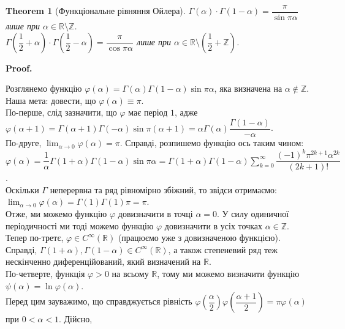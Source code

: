 \documentclass[a4paper, 10pt]{article}
\makeatletter
\def\qed{$\blacksquare$}
\theoremstyle{theoremdd}
\newtheorem{theorem}{Theorem}[subsection]
\theoremstyle{theoremdd}
\theoremstyle{theoremdd}
\theoremstyle{theoremdd}
\theoremstyle{theoremdd}
\theoremstyle{theoremdd}
\theoremstyle{theoremdd}
\theoremstyle{theoremdd}
\theoremstyle{theoremdd}
\renewenvironment{proof}[1][Proof.\\]{\par
\pushQED{\hfill \qed}%
\normalfont \topsep6\p@\@plus6\p@\relax
\trivlist
\item\relax
{\bfseries
#1\@addpunct{.}}\hspace\labelsep\ignorespaces
}{%
\popQED\endtrivlist\@endpefalse
}
\makeatother
\begin{document}
\begin{theorem}[Функціональне рівняння Ойлера]
$\Gamma(\alpha) \cdot \Gamma(1-\alpha) = \dfrac{\pi}{\sin \pi \alpha}$ лише при $\alpha \in \mathbb{R} \setminus \mathbb{Z}$.\\
$\Gamma \left(\dfrac{1}{2} + \alpha \right) \cdot \Gamma \left(\dfrac{1}{2}-\alpha \right) = \dfrac{\pi}{\cos \pi \alpha}$ лише при $\alpha \in \mathbb{R} \setminus \left( \dfrac{1}{2}  + \mathbb{Z} \right)$.
\end{theorem}

\begin{proof}
Розглянемо функцію $\varphi(\alpha) = \Gamma(\alpha) \Gamma(1-\alpha) \sin \pi \alpha$, яка визначена на $\alpha \notin \mathbb{Z}$. Наша мета: довести, що $\varphi(\alpha) \equiv \pi$.\\
По-перше, слід зазначити, що $\varphi$ має період $1$, адже\\
$\varphi(\alpha+1) = \Gamma(\alpha+1)\Gamma(-\alpha) \sin \pi(\alpha+1) = \alpha \Gamma(\alpha) \dfrac{\Gamma(1-\alpha)}{-\alpha}$.\\
По-друге, $\displaystyle\lim_{\alpha \to 0} \varphi(\alpha) = \pi$. Справді, розпишемо функцію ось таким чином:\\
$\displaystyle\varphi(\alpha) = \dfrac{1}{\alpha} \Gamma(1+\alpha) \Gamma(1-\alpha) \sin \pi \alpha = \Gamma(1+\alpha) \Gamma(1-\alpha) \sum_{k=0}^\infty \dfrac{(-1)^k\pi^{2k+1} \alpha^{2k}}{(2k+1)!}$.\\
Оскільки $\Gamma$ неперервна та ряд рівномірно збіжний, то звідси отримаємо:\\
$\displaystyle\lim_{\alpha \to 0} \varphi(\alpha) = \Gamma(1) \Gamma(1) \pi = \pi$.\\
Отже, ми можемо функцію $\varphi$ довизначити в точці $\alpha = 0$. У силу одиничної періодичності ми тоді можемо функцію $\varphi$ довизначити в усіх точках $\alpha \in \mathbb{Z}$.\\
Тепер по-третє, $\varphi \in C^{\infty}(\mathbb{R})$ (працюємо уже з довизначеною функцією). Справді, $\Gamma(1+\alpha), \Gamma(1-\alpha) \in C^{\infty}(\mathbb{R})$, а також степеневий ряд теж нескінченно диференційований, який визначений на $\mathbb{R}$.\\
По-четверте, функція $\varphi > 0$ на всьому $\mathbb{R}$, тому ми можемо визначити функцію $\psi(\alpha) = \ln \varphi(\alpha)$.\\
Перед цим зауважимо, що справджується рівність $\varphi\left( \dfrac{\alpha}{2} \right) \varphi\left( \dfrac{\alpha+1}{2}\right) = \pi \varphi(\alpha)$ при $0 < \alpha < 1$. Дійсно,\\

\end{proof}
\end{document}
